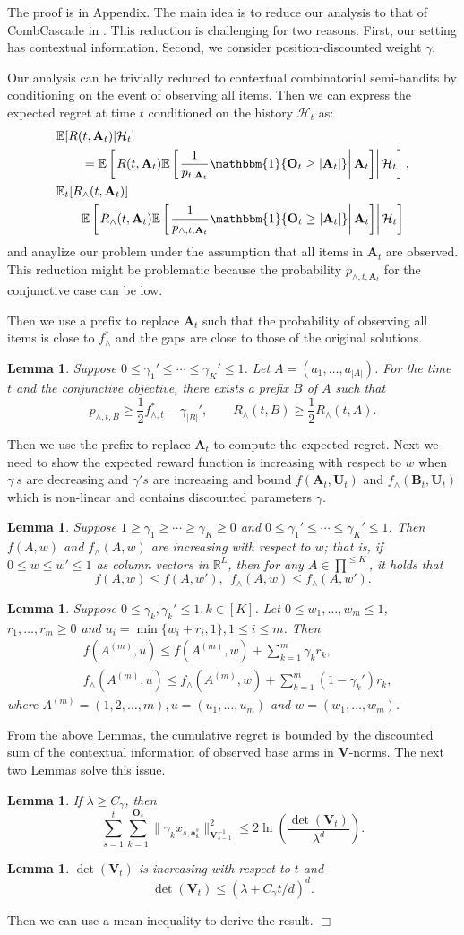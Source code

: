 \documentclass{article}
\newcommand{\EE}{\mathbb{E}}
\newcommand{\RR}{\mathbb{R}}
\newcommand{\bOne}{\mathbbm{1}}
\newcommand{\bA}{\mathbf{A}}
\newcommand{\ba}{\mathbf{a}}
\newcommand{\bB}{\mathbf{B}}
\newcommand{\bO}{\mathbf{O}}
\newcommand{\bU}{\mathbf{U}}
\newcommand{\bV}{\mathbf{V}}
\newcommand{\cH}{\mathcal{H}}
\newcommand{\abs}[1]{\left| #1 \right|}
\newcommand{\norm}[1]{\| #1 \|}
\newtheorem{lemma}[theorem]{Lemma}%
\newenvironment{proof}{\noindent {\textbf{Proof. }}}{$\Box$ \medskip}
\newcommand{\CLemmaPrefixExi}{
  Suppose $0 \leq \gamma_1' \leq \cdots \leq \gamma_K' \leq 1$. Let $A = (a_1, ..., a_{\abs{A}})$. For the time $t$ and the conjunctive objective, there exists a prefix $B$ of $A$ such that 
  $$
    p_{\wedge, t, B} \geq \frac{1}{2}f_{\wedge, t}^{\ast} - \gamma_{\abs{B}}', \qquad R_{\wedge}(t, B) \geq \frac{1}{2} R_{\wedge}(t, A).
  $$ 
}
\newcommand{\CLemmaIncre}{
  Suppose $1 \geq \gamma_1 \geq \cdots \geq \gamma_K \geq 0$ and $0 \leq \gamma_1' \leq \cdots \leq \gamma_K' \leq 1$. Then $f(A, w)$ and $f_{\wedge}(A, w)$ are increasing with respect to $w$; that is, if $0 \leq w \leq w' \leq 1$ as column vectors in $\RR^L$, then for any $A \in \prod^{\leq K}$, it holds that
  $$
    f(A, w) \leq f(A, w'), ~~ f_{\wedge}(A, w) \leq f_{\wedge}(A, w').
  $$
}
\newcommand{\CLemmaTech}{
  Suppose $0 \leq \gamma_k, \gamma_k' \leq 1, k \in [K]$. Let $0 \leq w_1, \ldots, w_m \leq 1$, $r_1, \ldots, r_m \geq 0$ and $u_i = \min\{w_i + r_i, 1\}, 1 \leq i \leq m$. Then
  \begin{align*}
    &f(A^{(m)}, u) \leq f(A^{(m)}, w) + \sum_{k=1}^{m} \gamma_k r_k,\\
    &f_{\wedge}(A^{(m)}, u) \leq f_{\wedge}(A^{(m)}, w) + \sum_{k=1}^{m} (1 - \gamma_k') r_k,
  \end{align*}
  where $A^{(m)} = (1, 2, \ldots, m), u = (u_1, \ldots, u_m)$ and $w = (w_1, \ldots, w_m)$.
}
\newcommand{\CLemmaSumXiEstimateInDet}{
  If $\lambda \geq C_\gamma$, then
  $$
    \sum_{s=1}^t \sum_{k=1}^{\bO_s} \norm{\gamma_k x_{s,\ba_{k}^s}}_{\bV_{s-1}^{-1}}^2 \leq 2\ln \left(\frac{\det(\bV_t)}{\lambda^d} \right).
  $$
}
\newcommand{\CLemmaDetVt}{
  $\det(\bV_t)$ is increasing with respect to $t$ and 
  $$
    \det(\bV_t) \leq (\lambda + C_\gamma t/d)^d.
  $$
}
\newcommand{\wei}[1]{}
\newcommand{\wei}[1]{{\color{blue!50!black}  [\text{Wei:} #1]}}
\begin{document}
\wei{I hided some paragraphs trying to explain the proof here.
	We will re-write a proof outline after revising the proofs.}

\begin{proof} %
  The proof is in Appendix. 
  The main idea is to reduce our analysis to that of CombCascade in \cite{kveton2015combinatorial}. 
  This reduction is challenging for two reasons. 
  First, our setting has contextual information. 
  Second, we consider position-discounted weight $\gamma$.

  Our analysis can be trivially reduced to contextual combinatorial semi-bandits by conditioning on the event of observing all items. 
  Then we can express the expected regret at time $t$ conditioned on the history $\cH_t$ as:
  \begin{align*}
    &\EE[R(t, \bA_t)|\cH_t] \\
    &\qquad = \EE \left[ \left. R(t, \bA_t) \EE \left[ \left. \frac{1}{p_{t, \bA_t}} \bOne\{\bO_t\geq\abs{\bA_t}\} \right| \bA_t \right]  \right| \cH_t \right],\\
    &\EE_t[R_{\wedge}(t, \bA_t)] \\
    &\qquad \EE \left[ \left. R_{\wedge}(t, \bA_t) \EE \left[ \left. \frac{1}{p_{\wedge, t, \bA_t}} \bOne\{\bO_t\geq\abs{\bA_t}\} \right| \bA_t \right]  \right| \cH_t \right] \\
  \end{align*}
  and anaylize our problem under the assumption that all items in $\bA_t$ are observed. This reduction might be problematic because the probability $p_{\wedge, t, \bA_t}$ for the conjunctive case can be low.

  Then we use a prefix to replace $\bA_t$ such that the probability of observing all items is close to $f_{\wedge}^{\ast}$ and the gaps are close to those of the original solutions.
  \begin{lemma}
    \CLemmaPrefixExi
  \end{lemma}
  Then we use the prefix to replace $\bA_t$ to compute the expected regret. 
  Next we need to show the expected reward function is increasing with respect to $w$ when $\gamma~s$ are decreasing and $\gamma's$ are increasing and bound $f(\bA_t, \bU_t)$ and $f_{\wedge}(\bB_t, \bU_t)$ which is non-linear and contains discounted parameters $\gamma$.
  \begin{lemma}
  	\CLemmaIncre
  \end{lemma}
  \begin{lemma}
  	\CLemmaTech
  \end{lemma}
  From the above Lemmas, the cumulative regret is bounded by the discounted sum of the contextual information of observed base arms in $\bV$-norms. The next two Lemmas solve this issue.
  \begin{lemma}
  	\CLemmaSumXiEstimateInDet
  \end{lemma}
  \begin{lemma}
  	\CLemmaDetVt
  \end{lemma}
  Then we can use a mean inequality to derive the result.
\end{proof}
\end{document}
